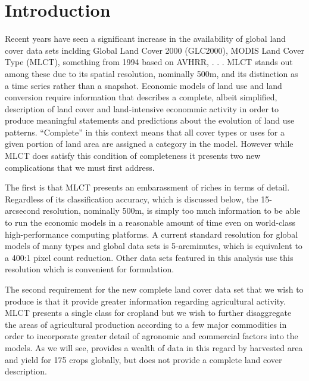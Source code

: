 
\chapter{Introduction}
\label{cha:introduction}

Recent years have seen a significant increase in the availability of
global land cover data sets inclding Global Land Cover 2000 (GLC2000),
MODIS Land Cover Type (MLCT),  something from 1994 based on AVHRR, . . .  MLCT stands out
among these due to its spatial resolution, nominally 500m, and its
distinction as a time series rather than a snapshot.  Economic models
of land use and land conversion require information that describes a
complete, albeit simplified, description of land cover and
land-intensive econommic activity in order to produce meaningful
statements and predictions about the evolution of land use patterns.
``Complete'' in this context means that all cover types or uses for a
given portion of land area are assigned a category in the model.
However while MLCT does satisfy this condition of completeness it
presents two new complications that we must first address.

The first is that MLCT presents an embarassment of riches in terms of
detail.  Regardless of its classification accuracy, which is discussed
below, the 15-arcsecond resolution, nominally 500m, is simply too much
information to be able to run the economic models in a reasonable
amount of time even on world-class high-performance computing
platforms.    A current standard resolution for global models of
many types and global data sets is 5-arcminutes, which is equivalent
to a 400:1 pixel count reduction.  Other data sets featured in this
analysis use this resolution which is convenient for formulation.

The second requirement for the new complete land cover data set that
we wish to produce is that it provide greater information regarding
agricultural activity.  MLCT presents a single class for cropland but
we wish to further disaggregate the areas of agricultural production
according to a few major commodities in order to incorporate greater
detail of agronomic and commercial factors into the models.  As we
will see, \citet{Monfreda2008} provides a wealth of data in this
regard by harvested area and yield for 175 crops globally, but does
not provide a complete land cover description.  

